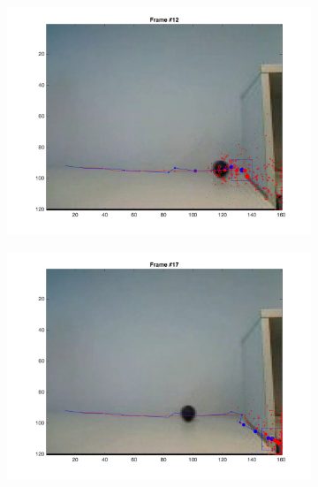 \documentclass{ethz_report}
\begin{document}
\begin{figure}[h]
\begin{subfigure}[b]{.25\textwidth}
        \includegraphics[width=1\linewidth]{images/video3_observe_high_11}
    \end{subfigure}%
    \begin{subfigure}[b]{.25\textwidth}
        \centering
        \includegraphics[width=1\linewidth]{images/video3_observe_high_16}
    \end{subfigure}
    \begin{subfigure}[b]{.25\textwidth}
        \centering

\end{subfigure}
\end{figure}
\end{document}
